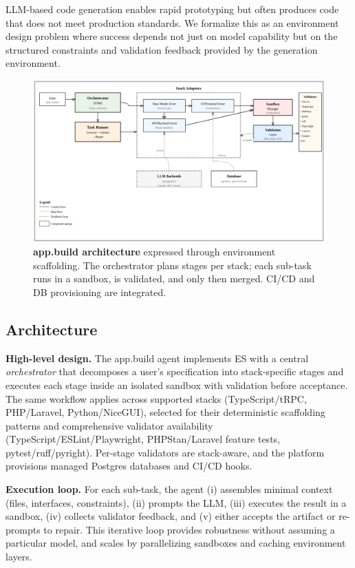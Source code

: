 \documentclass[conference]{IEEEtran}
\begin{document}
LLM-based code generation enables rapid prototyping but often produces code that does not meet production standards. We formalize this as an environment design problem where success depends not just on model capability but on the structured constraints and validation feedback provided by the generation environment.

\begin{figure}[t]
  \centering
  \includegraphics[width=\linewidth]{diagrams/appbuild-arch.png}
  \caption{\textbf{app.build architecture} expressed through environment scaffolding. The orchestrator plans stages per stack; each sub-task runs in a sandbox, is validated, and only then merged. CI/CD and DB provisioning are integrated.}
  \label{fig:appbuild-arch}
\end{figure}

\subsection{Architecture}

\textbf{High-level design.} The app.build agent implements ES with a central \emph{orchestrator} that decomposes a user's specification into stack-specific stages and executes each stage inside an isolated sandbox with validation before acceptance. The same workflow applies across supported stacks (TypeScript/tRPC, PHP/Laravel, Python/NiceGUI), selected for their deterministic scaffolding patterns and comprehensive validator availability (TypeScript/ESLint/Playwright, PHPStan/Laravel feature tests, pytest/ruff/pyright). Per-stage validators are stack-aware, and the platform provisions managed Postgres databases and CI/CD hooks.

\textbf{Execution loop.} For each sub-task, the agent (i) assembles minimal context (files, interfaces, constraints), (ii) prompts the LLM, (iii) executes the result in a sandbox, (iv) collects validator feedback, and (v) either accepts the artifact or re-prompts to repair. This iterative loop provides robustness without assuming a particular model, and scales by parallelizing sandboxes and caching environment layers.
\end{document}
